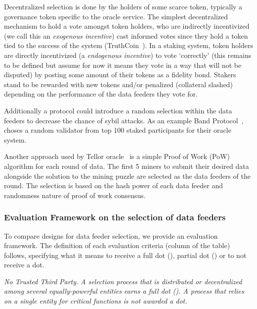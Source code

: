 Decentralized selection is done by the holders of some scarce token, typically a governance token specific to the oracle service. The simplest decentralized mechanism to hold a vote amongst token holders, who are indirectly incentivized (we call this an \textit{exogenous incentive}) cast informed votes since they hold a token tied to the success of the system (\eg TruthCoin~\cite{sztorc2015truthcoin}). In a staking system, token holders are directly incentivized (a \textit{endogenous incentive}) to vote `correctly' (this remains to be defined but assume for now it means they vote in a way that will not be disputed) by posting some amount of their tokens as a fidelity bond. Stakers stand to be rewarded with new tokens and/or penalized (collateral slashed) depending on the performance of the data feeders they vote for.


Additionally a protocol could introduce a random selection within the data feeders to decrease the chance of sybil attacks. As an example Band Protocol~\cite{bandwhitepaper}, choses a random validator from top 100 staked participants for their oracle system. 

Another approach used by Tellor oracle~\cite{tellorWhitepaper} is a simple Proof of Work (PoW) algorithm for each round of data. The first 5 miners to submit their desired data alongside the solution to the mining puzzle are selected as the data feeders of the round. The selection is based on the hash power of each data feeder and randomness nature of proof of work consensus.



\subsubsection{Evaluation Framework on the selection of data feeders}\label{evaluation_framework}
To compare designs for data feeder selection, we provide an evaluation framework. The definition of each evaluation criteria (\ie column of the table) follows, specifying what it means to receive a full dot (\full), partial dot (\prt) or to not receive a dot. 

\emph{No Trusted Third Party.} \textit{A selection process that is distributed or decentralized among several equally-powerful entities earns a full dot (\full). A process that relies on a single entity for critical functions is not awarded a dot.}

